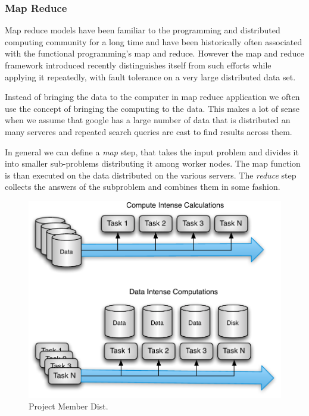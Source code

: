 
\subsubsection{Map Reduce}

Map reduce models have been familiar to the programming and distributed
computing community for a long time and have been historically often
associated with the functional programming's map and reduce. However
the map and reduce framework introduced recently \cite{Dean:mapreduce}
distinguishes itself from such efforts while
applying it repeatedly, with fault tolerance on a very large
distributed data set. 

Instead of bringing the data to the computer in map reduce application
we often use the concept of bringing the computing to the data. This
makes a lot of sense when we assume that google has a large number of
data that is distributed an many serveres and repeated search queries
are cast to find results across them. 

In general we can define a {\em map} step, that takes the input problem and divides it
into smaller sub-problems distributing it among worker nodes. The map
function is than executed on the data distributed on the various
servers. The {\em reduce} step collects the answers of the subproblem and combines
them in some fashion. 

\begin{figure}[htb]
  \centering
    \includegraphics[width=1.0\textwidth]{images/mapreduce.pdf}
  \caption{Project Member Dist.}
\end{figure}

